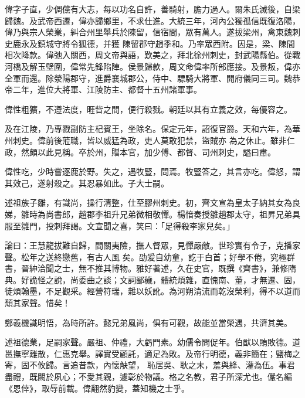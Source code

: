\begin{pinyinscope}
 偉字子直，少倜儻有大志，每以功名自許，善騎射，膽力過人。爾朱氏滅後，自梁歸魏。及武帝西遷，偉亦歸鄉里，不求仕進。大統三年，河內公獨孤信既復洛陽，偉乃與宗人榮業，糾合州里舉兵於陳留，信宿間，眾有萬人。遂拔梁州，禽東魏刺史鹿永及鎮城守將令狐德，并獲
 陳留郡守趙季和。乃率眾西附。因是，梁、陳間相次降款。偉弛入關西，周文帝與語，歎美之，拜北徐州刺史，封武陽縣伯。從戰河橋及解玉壁圍，偉常先鋒陷陣。侯景歸款，周文命偉率所部應接。及景叛，偉亦全軍而還。除滎陽郡守，進爵襄城郡公，侍中、驃騎大將軍、開府儀同三司。魏恭帝二年，進位大將軍、江陵防主、都督十五州諸軍事。



 偉性粗獷，不遵法度，睚眥之間，便行殺戮。朝廷以其有立義之效，每優容之。



 及在江陵，乃專戮副防主杞賓王，坐除名。保定元年，詔復官爵。天和六年，為華州刺史。偉前後蒞職，皆以威猛為政，吏人莫敢犯禁，盜賊亦
 為之休止。雖非仁政，然頗以此見稱。卒於州，贈本官，加少傅、都督、司州刺史，謚曰肅。



 偉性吃，少時嘗逐鹿於野。失之，遇牧豎，問焉。牧豎答之，其言亦吃。偉怒，謂其效己，遂射殺之。其忍暴如此。子大士嗣。



 述祖族子雛，有識尚，操行清整，仕至膠州刺史。初，齊文宣為皇太子納其女為良娣，雛時為尚書郎，趙郡李祖升兄弟微相敬憚。楊愔奏授雛趙郡太守，祖昇兄弟具服至雛門，投刺拜謁。文宣聞之喜，笑曰：「足得殺李家兒矣。」



 論曰：王慧龍拔難自歸，間關夷險，撫人督眾，見憚嚴敵。世珍實有令子，克播家聲。松年之送終戀舊，有古人風
 矣。劭爰自幼童，訖于白首；好學不倦，究極群書，晉紳洽聞之士，無不推其博物。雅好著述，久在史官，既撰《齊書》，兼修隋典。好詭怪之說，尚委曲之談；文詞鄙穢，體統煩雜，直愧南、董，才無遷、固，徒煩翰墨，不足觀采。經營符瑞，雜以妖訛。為河朔清流而乾沒榮利，得不以道而頹其家聲。惜矣！



 鄭羲機識明悟，為時所許。懿兄弟風尚，俱有可觀，故能並當榮遇，共濟其美。



 述祖德業，足嗣家聲。嚴祖、仲禮，大虧門素。幼儒令問促年。伯猷以賄敗德。道邕撫寧離散，仁惠克舉。譯實受顧託，適足為敗。及帝行明德，義非簡在；鹽梅之寄，固不攸歸。言追昔款，內懷觖望，
 恥居吳、耿之末，羞與絳、灌為伍。事君盡禮，既闕於夙心；不愛其親，遽彰於物議。格之名教，君子所深尤也。儼名編《恩倖》，取辱前載。偉翻然豹變，蓋知機之士乎。



\end{pinyinscope}